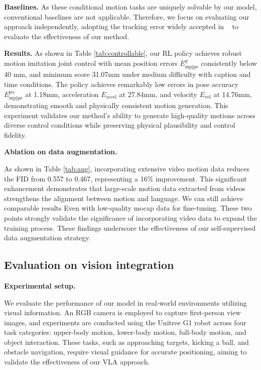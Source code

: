 \textbf{Baselines.}
As these conditional motion tasks are uniquely solvable by our model, conventional baselines are not applicable. Therefore, we focus on evaluating our approach independently, adopting the tracking error widely accepted in ~\cite{ji2024exbody2} to evaluate the effectiveness of our method.


\textbf{Results.}
As shown in Table \ref{tab:controllable}, our RL policy achieves robust motion imitation joint control with mean position errors \(E_{\text{mpjpe}}^g\) consistently below 40 mm, and minimum score 31.07mm under medium difficulty with caption and time conditions. The policy achieves remarkably low errors in pose accuracy $E_{\text{mpjpe}}^\text{pa}$ at {1.18mm}, acceleration $E_{\text{accel}}$ at {27.84mm}, and velocity $E_{\text{vel}}$ at {14.76mm}, demonstrating smooth and physically consistent motion generation. This experiment validates our method's ability to generate high-quality motions across diverse control conditions while preserving physical plausibility and control fidelity.


\textbf{Ablation on data augmentation.} 

As shown in Table \ref{tab:aug}, incorporating extensive video motion data reduces the FID from 0.557 to 0.467, representing a 16\% improvement. This significant enhancement demonstrates that large-scale motion data extracted from videos strengthens the alignment between motion and language. 
We can still achieve comparable results Even with low-quality mocap data for fine-tuning. These two points strongly validate the significance of incorporating video data to expand the training process.
These findings underscore the effectiveness of our self-supervised data augmentation strategy. 



\vspace{-10pt}
\subsection{Evaluation on vision integration }

\vspace{-5pt}
\textbf{Experimental setup.}

We evaluate the performance of our \modelname model in real-world environments utilizing visual information. An RGB camera is employed to capture first-person view images, and experiments are conducted using the Unitree G1 robot across four task categories: upper-body motion, lower-body motion, full-body motion, and object interaction. These tasks, such as approaching targets, kicking a ball, and obstacle navigation, require visual guidance for accurate positioning, aiming to validate the effectiveness of our VLA approach.




